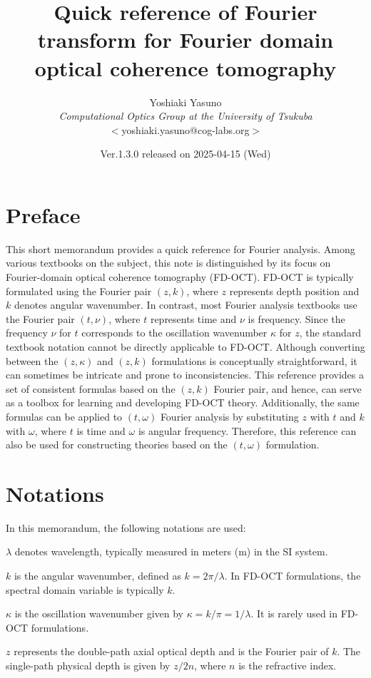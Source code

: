 \documentclass[a4paper]{article}
\title{Quick reference of Fourier transform for Fourier domain optical coherence tomography}
\author{%
	Yoshiaki Yasuno\\
	\textit{Computational Optics Group at the University of Tsukuba}\\
	$<$yoshiaki.yasuno@cog-labs.org$>$
}
\date{Ver.\@ 1.3.0 released on 2025-04-15 (Wed)}
\begin{document}
\maketitle
\tableofcontents

\section{Preface}
This short memorandum provides a quick reference for Fourier analysis.
Among various textbooks on the subject, this note is distinguished by its focus on Fourier-domain optical coherence tomography (FD-OCT).
FD-OCT is typically formulated using the Fourier pair $(z, k)$, where $z$ represents depth position and $k$ denotes angular wavenumber.
In contrast, most Fourier analysis textbooks use the Fourier pair $(t,\nu)$, where $t$ represents time and $\nu$ is frequency.
Since the frequency $\nu$ for $t$ corresponds to the oscillation wavenumber $\kappa$ for $z$, the standard textbook notation cannot be directly applicable to FD-OCT.
Although converting between the $(z,\kappa)$ and $(z,k)$ formulations is conceptually straightforward, it can sometimes be intricate and prone to inconsistencies.
This reference provides a set of consistent formulas based on the $(z, k)$ Fourier pair, and hence, can serve as a toolbox for learning and developing FD-OCT theory.
Additionally, the same formulas can be applied to  $(t, \omega)$ Fourier analysis by substituting $z$ with $t$ and $k$ with $\omega$, where $t$ is time and $\omega$ is angular frequency.
Therefore, this reference can also be used for constructing theories based on the $(t, \omega)$ formulation.

\section{Notations}
In this memorandum, the following notations are used:

$\lambda$ denotes wavelength, typically measured in meters (m) in the SI system.

$k$ is the angular wavenumber, defined as $k = 2\pi/\lambda$.
In FD-OCT formulations, the spectral domain variable is typically $k$.

$\kappa$ is the oscillation wavenumber given by $\kappa = k/\pi= 1/\lambda$.
It is rarely used in FD-OCT formulations.

$z$ represents the double-path axial optical depth and is the Fourier pair of  $k$.
The single-path physical depth is given by $z/2n$, where $n$ is the refractive index.
\end{document}
